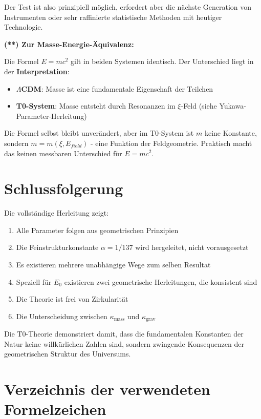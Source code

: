\documentclass[12pt,a4paper]{article}
\theoremstyle{definition}
\begin{document}
Der Test ist also prinzipiell möglich, erfordert aber die nächste Generation von Instrumenten oder sehr raffinierte statistische Methoden mit heutiger Technologie.

\textbf{(**) Zur Masse-Energie-Äquivalenz:}

Die Formel $E = mc^2$ gilt in beiden Systemen identisch. Der Unterschied liegt in der \textbf{Interpretation}:

\begin{itemize}
	\item \textbf{$\Lambda$CDM}: Masse ist eine fundamentale Eigenschaft der Teilchen
	\item \textbf{T0-System}: Masse entsteht durch Resonanzen im $\xi$-Feld (siehe Yukawa-Parameter-Herleitung)
\end{itemize}

Die Formel selbst bleibt unverändert, aber im T0-System ist $m$ keine Konstante, sondern $m = m(\xi, E_{field})$ - eine Funktion der Feldgeometrie. Praktisch macht das keinen messbaren Unterschied für $E = mc^2$.
	\section{Schlussfolgerung}
	
	Die vollst\"andige Herleitung zeigt:
	\begin{enumerate}
		\item Alle Parameter folgen aus geometrischen Prinzipien
		\item Die Feinstrukturkonstante $\alpha = 1/137$ wird hergeleitet, nicht vorausgesetzt
		\item Es existieren mehrere unabh\"angige Wege zum selben Resultat
		\item Speziell f\"ur $E_0$ existieren zwei geometrische Herleitungen, die konsistent sind
		\item Die Theorie ist frei von Zirkularit\"at
		\item Die Unterscheidung zwischen $\kappa_{\text{mass}}$ und $\kappa_{\text{grav}}$
	\end{enumerate}
	
	Die T0-Theorie demonstriert damit, dass die fundamentalen Konstanten der Natur keine willk\"urlichen Zahlen sind, sondern zwingende Konsequenzen der geometrischen Struktur des Universums.

\appendix
\section{Verzeichnis der verwendeten Formelzeichen}
\label{app:symbols_de}
\end{document}
